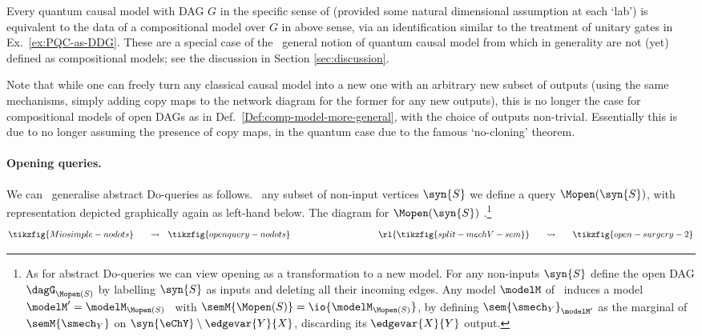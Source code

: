 \documentclass{article}
\begin{document}
\begin{example} \label{ex:QCM-as-comp-model-over-DAG} 
Every quantum causal model with DAG $G$ in the specific sense of \cite{costa2016quantum} (provided some natural dimensional assumption at each `lab') is equivalent to the data of a compositional model over $G$ in above sense, via an identification similar to the treatment of unitary gates in Ex.~\ref{ex:PQC-as-DDG}. These are a special case of the \ general notion of quantum causal model from \cite{barrett2019quantum, allen2017quantum} which in generality are not (yet) defined as compositional models; see the discussion in Section \ref{sec:discussion}.  
\end{example}


Note that while one can freely turn any classical causal model into a new one with an arbitrary new subset of outputs (using the same mechanisms, simply adding copy maps to the network diagram for the former for any new outputs), this is no longer the case for compositional models of open DAGs as in Def.~\ref{Def:comp-model-more-general}, with the choice of outputs non-trivial. Essentially this is due to no longer assuming the presence of copy maps, in the quantum case due to the famous  `no-cloning' theorem. 


\paragraph{Opening queries.}
We can \ generalise abstract Do-queries as follows. 
\ any subset of non-input vertices $\syn{S}$ we define a query $\Mopen(\syn{S})$, with representation depicted graphically again as left-hand below. The diagram for $\Mopen(\syn{S})$ .\footnote{As for abstract Do-queries we can view opening as a transformation to a new model. For any non-inputs $\syn{S}$ define the open DAG $\dagG_{\Mopen(S)}$ by labelling $\syn{S}$ as inputs and deleting all their incoming edges. Any model $\modelM$ of \ induces a model $\modelM' = \modelM_{\Mopen(S)}$ \ with $\semM{\Mopen(S)} = \io{\modelM_{\Mopen(S)}}$, by defining $\sem{\smech_Y}_{\modelM'}$ as the marginal of $\semM{\smech_Y}$ on $\syn{\eChY} \setminus \edgevar{Y}{X}$, discarding its $\edgevar{X}{Y}$ output.} 
\[
\tikzfig{Miosimple-nodots} 
\quad \ \ \rightsquigarrow \ \ 
\tikzfig{openquery-nodots}
\qquad 
\qquad 
\qquad
\qquad \qquad 
\rl{\tikzfig{split-mechV-sem}}
\quad \ \  
\rightsquigarrow
\quad  \ \ 
\tikzfig{open-surgery-2}
\]
\end{document}
